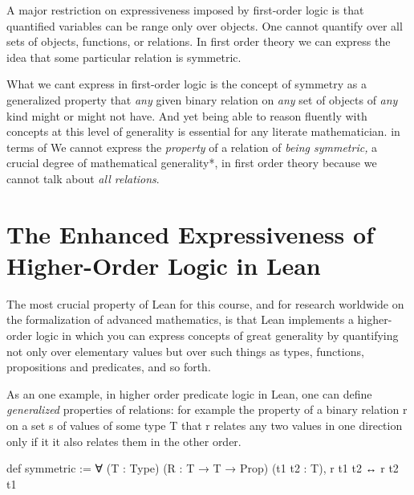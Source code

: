 \documentclass{book}
\newenvironment{Shaded}{\begin{snugshade}}{\end{snugshade}}
\newcommand{\NormalTok}[1]{#1}
\begin{document}
A major restriction on expressiveness imposed by first-order logic
is that quantified variables can be range only over objects. One
cannot quantify over all sets of objects, functions, or relations.
In first order theory we can express the idea that some particular
relation is symmetric.

\begin{Shaded}
\begin{Highlighting}[]

\end{Highlighting}
\end{Shaded}

What we can\textquotesingle t express in first-order logic
is the concept of symmetry as a generalized property that \emph{any} given
binary relation on \emph{any} set of objects of \emph{any} kind might or might
not have. And yet being able to reason fluently with concepts at this
level of generality is essential for any literate mathematician.  in terms of We cannot express the \emph{property} of a relation
of \emph{being symmetric,} a crucial degree of mathematical generality*,
in first order theory because we cannot talk about \emph{all relations}.

\hypertarget{book__pandoc__debug__src__predlogic.md__the-enhanced-expressiveness-of-higher-order-logic-in-lean}{%
\section*{The Enhanced Expressiveness of Higher-Order Logic in Lean}\label{book__pandoc__debug__src__predlogic.md__the-enhanced-expressiveness-of-higher-order-logic-in-lean}}

The most crucial property of Lean for this course, and for research
worldwide on the formalization of advanced mathematics, is that Lean
implements a higher-order logic in which you can express concepts of
great generality by quantifying not only over elementary values but
over such things as types, functions, propositions and predicates,
and so forth.

As an one example, in higher order predicate logic
in Lean, one can define \emph{generalized} properties of relations: for
example the property of a binary relation r on a set s of values of
some type T that r relates any two values in one direction only if
it it also relates them in the other order.

\begin{Shaded}
\begin{Highlighting}[]
\NormalTok{def symmetric := }
\NormalTok{∀ (T : Type) }
\NormalTok{  (R : T → T → Prop) }
\NormalTok{  (t1 t2 : T),}
\NormalTok{r t1 t2 ↔ r t2 t1}
\end{Highlighting}
\end{Shaded}
\end{document}
